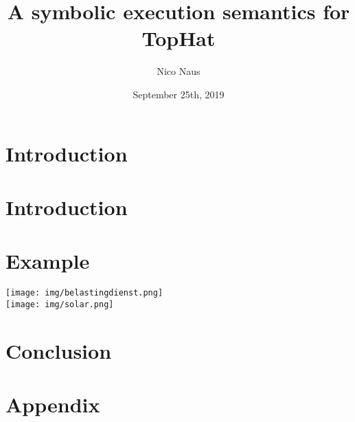 \documentclass{beamer}
\title[SYMBOLIC TOPHAT]{A symbolic execution semantics for TopHat}
\author{Nico Naus}
\institute{\texttt{[image: img/uulogo.png]}}
\date{September 25th, 2019}
\begin{document}
\begin{frame}
  \titlepage
\end{frame}


\section{Introduction}



\section{Introduction}
\begin{frame}{}

\end{frame}



\section{Example}
\begin{frame}{}
\texttt{[image: img/belastingdienst.png]}\\
\pause
\texttt{[image: img/solar.png]}
\end{frame}









\section{Conclusion}


\begin{frame}

\end{frame}

\section*{Appendix}
\appendix
\end{document}
